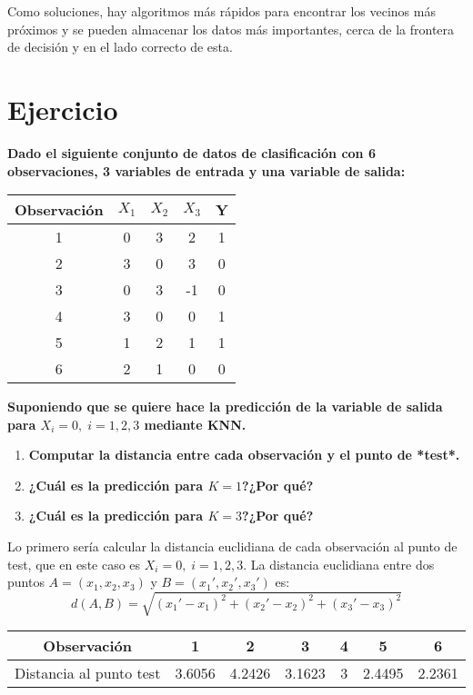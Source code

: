 Como soluciones, hay algoritmos más rápidos para encontrar los vecinos más próximos y se pueden almacenar los datos más importantes, cerca de la frontera de decisión y en el lado correcto de esta.


\section{Ejercicio}

\begin{example}
\textbf{Dado el siguiente conjunto de datos de clasificación con 6 observaciones, 3 variables de entrada y una variable de salida:}

\begin{table}[H]
\centering
\begin{tabular}{ccccc}
\hline \hline
Observación & $X_1$ & $X_2$ & $X_3$ & Y \\ \hline \hline
1           & 0  & 3  & 2  & 1 \\ 
2           & 3  & 0  & 3  & 0 \\ 
3           & 0  & 3  & -1 & 0 \\ 
4           & 3  & 0  & 0  & 1 \\ 
5           & 1  & 2  & 1  & 1 \\ 
6           & 2  & 1  & 0  & 0 \\ \hline
\end{tabular}
\end{table}

\textbf{Suponiendo que se quiere hace la predicción de la variable de salida para $X_i = 0, \; i = 1, 2, 3$ mediante KNN.}
\begin{enumerate}
\item \textbf{Computar la distancia entre cada observación y el punto de *test*.}
\item \textbf{¿Cuál es la predicción para $K = 1$?¿Por qué?}
\item \textbf{¿Cuál es la predicción para $K = 3$?¿Por qué?} 
\end{enumerate}

Lo primero sería calcular la distancia euclidiana de cada observación al punto de test, que en este caso es $X_i = 0, \; i = 1, 2, 3$. La distancia euclidiana entre dos puntos $A = (x_1, x_2, x_3)$ y $B = (x_1', x_2', x_3')$ es:
\begin{equation*}
d(A, B) = \sqrt{(x_1' - x_1)^2 + (x_2' - x_2)^2 + (x_3' - x_3)^2}
\end{equation*}

\begin{table}[H]
\centering
\begin{tabular}{ccccccc}
\hline 
Observación & 1 & 2 & 3 & 4 & 5 & 6 \\ \hline
Distancia al punto test & 3.6056 & 4.2426 & 3.1623 & 3 & 2.4495 & 2.2361 \\ \hline
\end{tabular}
\end{table}


\end{example}
